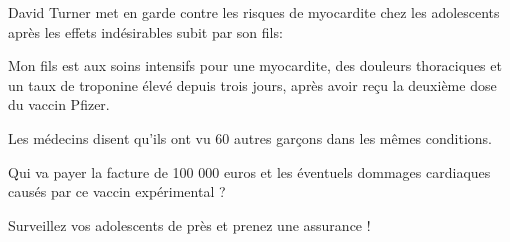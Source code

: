 David Turner met en garde contre les risques de myocardite chez les adolescents
après les effets indésirables subit par son fils:

Mon fils est aux soins intensifs pour une myocardite, des douleurs thoraciques
et un taux de troponine élevé depuis trois jours, après avoir reçu la deuxième
dose du vaccin Pfizer.

Les médecins disent qu'ils ont vu 60 autres garçons dans les mêmes conditions.

Qui va payer la facture de 100 000 euros et les éventuels dommages cardiaques
causés par ce vaccin expérimental ?

Surveillez vos adolescents de près et prenez une assurance !

